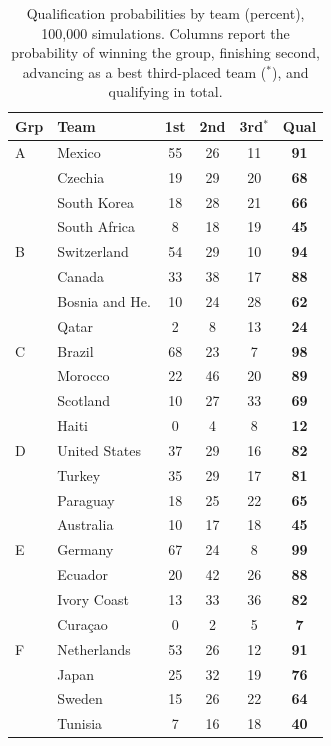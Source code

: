 \documentclass[11pt,a4paper]{article}
\begin{document}
\begin{table}[ht]
\centering\scriptsize
\caption{Qualification probabilities by team (percent), 100{,}000 simulations. Columns report the probability of winning the group, finishing second, advancing as a best third-placed team ($^{*}$), and qualifying in total.}
\label{tab:qual}
\begin{minipage}{0.49\textwidth}\centering
\begin{tabular}{llcccc}
\toprule
Grp & Team & 1st & 2nd & 3rd$^{*}$ & Qual \\
\midrule
A & Mexico & 55 & 26 & 11 & \textbf{91} \\
 & Czechia & 19 & 29 & 20 & \textbf{68} \\
 & South Korea & 18 & 28 & 21 & \textbf{66} \\
 & South Africa & 8 & 18 & 19 & \textbf{45} \\
\addlinespace
B & Switzerland & 54 & 29 & 10 & \textbf{94} \\
 & Canada & 33 & 38 & 17 & \textbf{88} \\
 & Bosnia and He. & 10 & 24 & 28 & \textbf{62} \\
 & Qatar & 2 & 8 & 13 & \textbf{24} \\
\addlinespace
C & Brazil & 68 & 23 & 7 & \textbf{98} \\
 & Morocco & 22 & 46 & 20 & \textbf{89} \\
 & Scotland & 10 & 27 & 33 & \textbf{69} \\
 & Haiti & 0 & 4 & 8 & \textbf{12} \\
\addlinespace
D & United States & 37 & 29 & 16 & \textbf{82} \\
 & Turkey & 35 & 29 & 17 & \textbf{81} \\
 & Paraguay & 18 & 25 & 22 & \textbf{65} \\
 & Australia & 10 & 17 & 18 & \textbf{45} \\
\addlinespace
E & Germany & 67 & 24 & 8 & \textbf{99} \\
 & Ecuador & 20 & 42 & 26 & \textbf{88} \\
 & Ivory Coast & 13 & 33 & 36 & \textbf{82} \\
 & Curaçao & 0 & 2 & 5 & \textbf{7} \\
\addlinespace
F & Netherlands & 53 & 26 & 12 & \textbf{91} \\
 & Japan & 25 & 32 & 19 & \textbf{76} \\
 & Sweden & 15 & 26 & 22 & \textbf{64} \\
 & Tunisia & 7 & 16 & 18 & \textbf{40} \\

\end{tabular}
\end{minipage}
\end{table}
\end{document}
